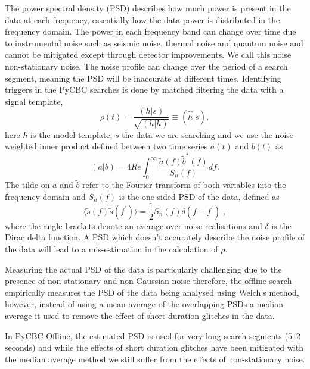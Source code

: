The power spectral density (PSD) describes how much power is present in the data at each frequency, essentially how the data power is distributed in the frequency domain. The power in each frequency band can change over time due to instrumental noise such as seismic noise, thermal noise and quantum noise and cannot be mitigated except through detector improvements. We call this noise non-stationary noise. The noise profile can change over the period of a search segment, meaning the PSD will be inaccurate at different times. Identifying triggers in the PyCBC searches is done by matched filtering the data with a signal template,
%
\begin{equation}
  \rho(t) = \frac{(h | s)}{\sqrt{(h | h)}} \equiv (\hat{h} | s),
  \label{5:eqn:mf_1}
\end{equation}
%
here $h$ is the model template, $s$ the \gwadj data we are searching and we use the noise-weighted inner product defined between two time series $a(t)$ and $b(t)$ as
%
\begin{equation}
  (a | b) = 4 Re \int^{\infty}_{0} \frac{\tilde{a}(f) \tilde{b}^*(f)}{S_n(f)} 
  df.
  \label{5:eqn:inner_product}
\end{equation}
%
The tilde on $\tilde{a}$ and $\tilde{b}$ refer to the Fourier-transform of both variables into the frequency domain and $S_n(f)$ is the one-sided PSD of the data, defined as
%
\begin{equation}
  \langle \tilde{s}(f) \tilde{s}(f^\prime) \rangle = \frac{1}{2} S_n(f) \delta(f - f^\prime) \;,
  \label{5:eqn:psd}
\end{equation}
%
where the angle brackets denote an average over noise realisations and $\delta$ is the Dirac delta function. A PSD which doesn't accurately describe the noise profile of the data will lead to a mis-estimation in the calculation of $\rho$.

Measuring the actual PSD of the data is particularly challenging due to the presence of non-stationary and non-Gaussian noise therefore, the offline search empirically measures the PSD of the \gwadj data being analysed using Welch's method, however, instead of using a mean average of the overlapping PSDs a median average it used to remove the effect of short duration glitches in the data.

In PyCBC Offline, the estimated PSD is used for very long search segments ($512$ seconds) and while the effects of short duration glitches have been mitigated with the median average method we still suffer from the effects of non-stationary noise. 

